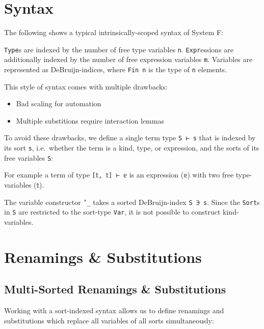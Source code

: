 \documentclass[sigplan,10pt]{acmart}
\newenvironment{LibCode*}{%
  \begin{tcolorbox}[%
    colframe=white,%
    boxrule=0.0pt,%
    top=2.5pt,%
    left=2.5pt,%
    bottom=2.5pt,%
    right=2.5pt,%
    boxsep=0pt%
  ]\vspace{-0.2\baselineskip}%
}{%
  \vspace{-1\baselineskip}%
  \end{tcolorbox}%
}
\newenvironment{ExampleCode*}{%
  \begin{tcolorbox}[%
    colframe=white,%
    colback=yellow!5,%
    boxrule=0.0pt,%
    top=2.5pt,%
    left=2.5pt,%
    bottom=2.5pt,%
    right=2.5pt,%
    boxsep=0pt%
  ]\vspace{-0.2\baselineskip}%
}{%
  \vspace{-1\baselineskip}%
  \end{tcolorbox}%
}
\newcommand*\LibCode[1]{\begin{LibCode*}{#1}\end{LibCode*}}
\newcommand*\AppCode[1]{{#1}}
\newcommand*\ExampleCode[1]{\begin{ExampleCode*}{#1}\end{ExampleCode*}}
\begin{document}
  \newpage

  \section{Syntax}
  The following shows a typical intrinsically-scoped syntax of System F:
  \ExampleCode\FUnsortedSyntax

  \texttt{Type}s are indexed by the number of free type variables \texttt{n}.
  \texttt{Expr}essions are additionally indexed by the number of free expression variables \texttt{m}.
  Variables are represented as DeBruijn-indices, where \texttt{Fin n} is the type of \texttt{n} elements.

  This style of syntax comes with multiple drawbacks:
  \begin{itemize}
  \item Bad scaling for automation
  \item Multiple substitions require interaction lemmas
  \end{itemize}

  To avoid these drawbacks, we define a single term type \texttt{S~⊢~s} that is indexed by its sort \texttt{s},
  i.e.\ whether the term is a kind, type, or expression, and the sorts of its free variables \texttt{S}:

  For example a term of type \texttt{[𝕥, 𝕥] ⊢ 𝕖} is an expression (\texttt{𝕖}) with two free type-variables (\texttt{𝕥}).
  \LibCode\KSortTy

  \AppCode\FSort


  \LibCode\KVariables
  \AppCode\FSyntax
  The variable constructor \texttt{'\_} takes a sorted DeBruijn-index \texttt{S~∋~s}.
  Since the \texttt{Sort}s in \texttt{S} are restricted to the sort-type \texttt{Var}, it is not possible to construct kind-variables.

  \LibCode\KTerms
  \AppCode\FTerms

  \section{Renamings \& Substitutions}
  \subsection{Multi-Sorted Renamings \& Substitutions}
  Working with a sort-indexed syntax allows us to define renamings and substitutions
  which replace all variables of all sorts simultaneously:
\end{document}
